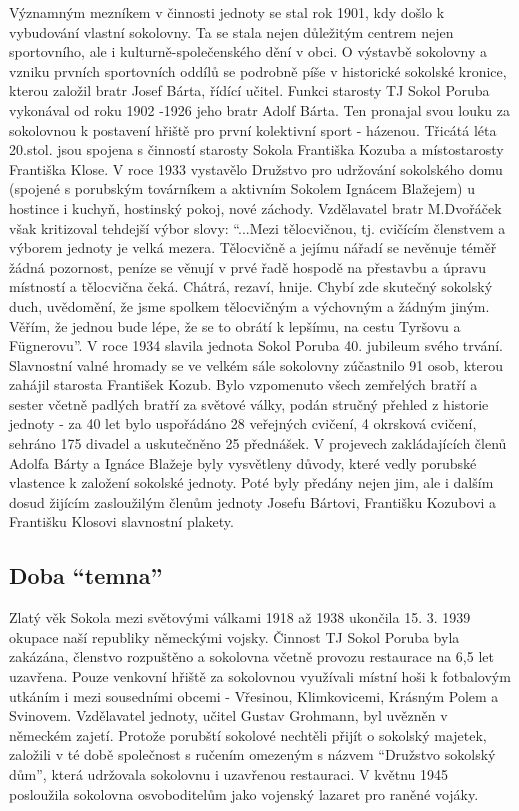 \documentclass[openany]{report}
\begin{document}
Významným mezníkem v činnosti jednoty se stal rok 1901, kdy došlo k vybudování vlastní sokolovny. Ta se stala nejen důležitým centrem nejen sportovního, ale i kulturně-společenského dění v obci. O výstavbě sokolovny a vzniku prvních sportovních oddílů se podrobně píše v historické sokolské kronice, kterou založil bratr Josef Bárta, řídící učitel. Funkci starosty TJ Sokol Poruba vykonával od roku 1902 -1926 jeho bratr Adolf Bárta. Ten pronajal svou louku za sokolovnou k postavení hřiště pro první kolektivní sport - házenou. Třicátá léta 20.stol. jsou spojena s činností starosty Sokola  Františka Kozuba a místostarosty Františka Klose. V roce 1933  vystavělo Družstvo pro udržování sokolského domu (spojené s porubským továrníkem a aktivním Sokolem Ignácem Blažejem) u hostince i kuchyň, hostinský pokoj, nové záchody. Vzdělavatel bratr M.Dvořáček však kritizoval tehdejší výbor slovy: \enquote{...Mezi tělocvičnou, tj. cvičícím členstvem a výborem jednoty je velká mezera. Tělocvičně a jejímu nářadí se nevěnuje téměř žádná pozornost, peníze se věnují v prvé řadě hospodě na přestavbu a úpravu místností a tělocvična čeká. Chátrá, rezaví, hnije. Chybí zde skutečný sokolský duch, uvědomění, že jsme spolkem tělocvičným a výchovným a žádným jiným. Věřím, že jednou bude lépe, že se to obrátí k lepšímu, na cestu Tyršovu a Fügnerovu}.
V roce 1934 slavila jednota Sokol Poruba 40. jubileum svého trvání. Slavnostní valné hromady se ve velkém sále sokolovny zúčastnilo 91 osob, kterou zahájil starosta František Kozub. Bylo vzpomenuto všech zemřelých bratří a sester včetně padlých bratří za světové války, podán stručný přehled z historie jednoty - za 40 let bylo uspořádáno 28 veřejných cvičení, 4 okrsková cvičení, sehráno 175 divadel a uskutečněno 25 přednášek. V projevech zakládajících členů Adolfa Bárty a Ignáce Blažeje byly vysvětleny důvody, které vedly porubské vlastence k založení sokolské jednoty. Poté byly předány nejen jim, ale i dalším dosud žijícím zasloužilým členům jednoty Josefu Bártovi, Františku Kozubovi a Františku Klosovi slavnostní plakety.

\subsection{Doba \enquote{temna}}

Zlatý věk Sokola mezi světovými válkami 1918 až 1938 ukončila 15. 3. 1939 okupace naší republiky německými vojsky. Činnost TJ Sokol Poruba byla zakázána, členstvo rozpuštěno a sokolovna včetně provozu restaurace na 6,5 let uzavřena. Pouze venkovní hřiště za sokolovnou využívali místní hoši k fotbalovým utkáním i mezi sousedními obcemi - Vřesinou, Klimkovicemi, Krásným Polem a Svinovem. Vzdělavatel jednoty, učitel Gustav Grohmann, byl uvězněn v německém zajetí. Protože porubští sokolové nechtěli přijít o sokolský majetek, založili v té době společnost s ručením omezeným s názvem \enquote{Družstvo sokolský dům}, která udržovala sokolovnu i uzavřenou restauraci. V květnu 1945 posloužila sokolovna osvoboditelům jako vojenský lazaret pro raněné vojáky.
\end{document}
